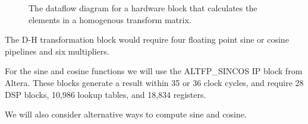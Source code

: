 \begin{figure}[ht]
\center
{}
\caption{The dataflow diagram for a hardware block that calculates the elements in a homogenous transform matrix.}
\label{fig:dh_transform_block}
\end{figure}

The D-H transformation block would require four floating point sine or cosine pipelines and six multipliers.

For the sine and cosine functions we will use the ALTFP\_SINCOS IP block from Altera. These blocks generate a result within 35 or 36 clock cycles, and require 28 DSP blocks, 10,986 lookup tables, and 18,834 registers.

We will also consider alternative ways to compute sine and cosine.